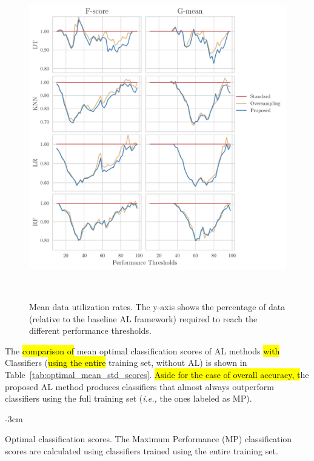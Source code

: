 \documentclass[preprint, 12pt]{elsarticle}
\begin{document}
\begin{figure}
	\centering
	\includegraphics[width=1\linewidth]{../analysis/data_utilization_rate}
    \caption{%
        Mean data utilization rates. The y-axis shows the percentage of data
        (relative to the baseline AL framework) required to reach the
        different performance thresholds.
    }~\label{fig:dur}
\end{figure}

The \hl{comparison of} mean optimal classification scores of AL methods
\hl{with} Classifiers (\hl{using the entire} training set, without AL)
is shown in Table~\ref{tab:optimal_mean_std_scores}. \hl{Aside for the case of
overall accuracy, t}he proposed AL method
produces classifiers that almost always outperform classifiers
using the full training set (\textit{i.e.,} the ones labeled as MP).

\begin{table}
    \centering
    \addtolength{\leftskip} {-3cm}
    \addtolength{\rightskip}{-3cm}
    \caption{\label{tab:optimal_mean_std_scores}
        Optimal classification scores. The Maximum Performance (MP)
        classification scores are calculated using classifiers trained using
        the entire training set.
    }
\end{table}
\end{document}
